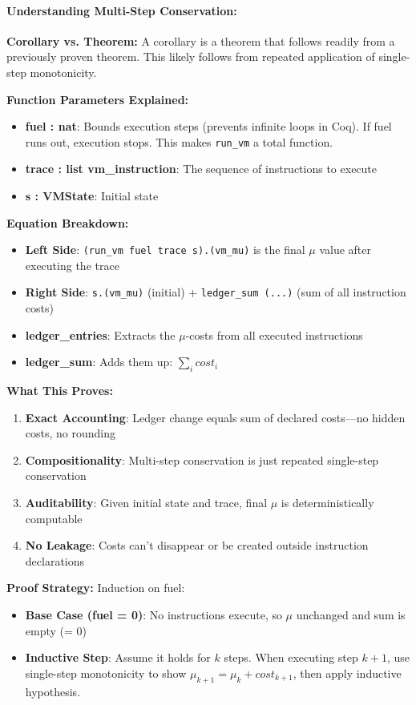 \paragraph{Understanding Multi-Step Conservation:}
\textbf{Corollary vs. Theorem:} A corollary is a theorem that follows readily from a previously proven theorem. This likely follows from repeated application of single-step monotonicity.

\textbf{Function Parameters Explained:}
\begin{itemize}
    \item \textbf{fuel : nat}: Bounds execution steps (prevents infinite loops in Coq). If fuel runs out, execution stops. This makes \texttt{run\_vm} a total function.
    \item \textbf{trace : list vm\_instruction}: The sequence of instructions to execute
    \item \textbf{s : VMState}: Initial state
\end{itemize}

\textbf{Equation Breakdown:}
\begin{itemize}
    \item \textbf{Left Side}: \texttt{(run\_vm fuel trace s).(vm\_mu)} is the final $\mu$ value after executing the trace
    \item \textbf{Right Side}: \texttt{s.(vm\_mu)} (initial) + \texttt{ledger\_sum (...)} (sum of all instruction costs)
    \item \textbf{ledger\_entries}: Extracts the $\mu$-costs from all executed instructions  
    \item \textbf{ledger\_sum}: Adds them up: $\sum_{i} cost_i$
\end{itemize}

\textbf{What This Proves:}
\begin{enumerate}
    \item \textbf{Exact Accounting}: Ledger change equals sum of declared costs---no hidden costs, no rounding
    \item \textbf{Compositionality}: Multi-step conservation is just repeated single-step conservation
    \item \textbf{Auditability}: Given initial state and trace, final $\mu$ is deterministically computable
    \item \textbf{No Leakage}: Costs can't disappear or be created outside instruction declarations
\end{enumerate}

\textbf{Proof Strategy:} Induction on fuel:
\begin{itemize}
    \item \textbf{Base Case (fuel = 0)}: No instructions execute, so $\mu$ unchanged and sum is empty (= 0)
    \item \textbf{Inductive Step}: Assume it holds for $k$ steps. When executing step $k+1$, use single-step monotonicity to show $\mu_{k+1} = \mu_k + cost_{k+1}$, then apply inductive hypothesis.
\end{itemize}

